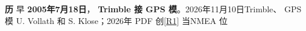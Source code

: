 \documentclass[11pt,a4paper]{article}
\numberwithin{equation}{section}
\numberwithin{figure}{section}
\begin{document}
\textbf{{\cjkfont 历}\allowbreak{}} {\cjkfont 早}\allowbreak{} \textbf{2005{\cjkfont 年}\allowbreak{}7{\cjkfont 月}\allowbreak{}18{\cjkfont 日}\allowbreak{}}{\cjkfont ，}\allowbreak{} \textbf{Trimble {\cjkfont 接}\allowbreak{} GPS {\cjkfont 模}\allowbreak{}}{\cjkfont 。}\allowbreak{}2026{\cjkfont 年}\allowbreak{}11{\cjkfont 月}\allowbreak{}10{\cjkfont 日}\allowbreak{}Trimble{\cjkfont 、}\allowbreak{} GPS {\cjkfont 模}\allowbreak{} U. Vollath {\cjkfont 和}\allowbreak{} S. Klose{\cjkfont ；}\allowbreak{}2026{\cjkfont 年}\allowbreak{} PDF {\cjkfont 创}\allowbreak{}\hyperlink{ref-R1}{[R1]} {\cjkfont 当}\allowbreak{}NMEA {\cjkfont 位}\allowbreak{}
\end{document}
